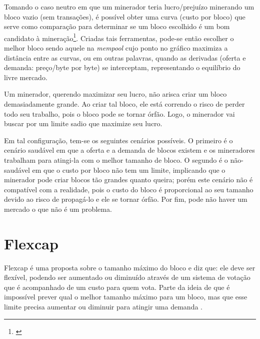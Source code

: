 Tomando o caso neutro em que um minerador teria lucro/prejuízo minerando um bloco vazio (sem transações), é possível obter uma curva (custo por bloco) que serve como comparação para determinar se um bloco escolhido é um bom candidato à mineração\footnote{\cite[p. 6, Fig. 4]{bib:fee-market}}. Criadas tais ferramentas, pode-se então escolher o melhor bloco sendo aquele na \textit{mempool} cujo ponto no gráfico maximiza a distância entre as curvas, ou em outras palavras, quando as derivadas (oferta e demanda: preço/byte por byte) se interceptam, representando o equilíbrio do livre mercado.

Um minerador, querendo maximizar seu lucro, não arisca criar um bloco demasiadamente grande. Ao criar tal bloco, ele está correndo o risco de perder todo seu trabalho, pois o bloco pode se tornar órfão. Logo, o minerador vai buscar por um limite sadio que maximize seu lucro.

Em tal configuração, tem-se os seguintes cenários possíveis. O primeiro é o cenário saudável em que a oferta e a demanda de blocos existem e os mineradores trabalham para atingi-la com o melhor tamanho de bloco. O segundo é o não-saudável em que o custo por bloco não tem um limite, implicando que o minerador pode criar blocos tão grandes quanto queira; porém este cenário não é compatível com a realidade, pois o custo do bloco é proporcional ao seu tamanho devido ao risco de propagá-lo e ele se tornar órfão. Por fim, pode não haver um mercado o que não é um problema.

\section{Flexcap}

Flexcap é uma proposta sobre o tamanho máximo do bloco e diz que: ele deve ser flexível, podendo ser aumentado ou diminuído através de um sistema de votação que é acompanhado de um custo para quem vota. Parte da ideia de que é impossível prever qual o melhor tamanho máximo para um bloco, mas que esse limite precisa aumentar ou diminuir para atingir uma demanda \cite{bib:flexcap}.

